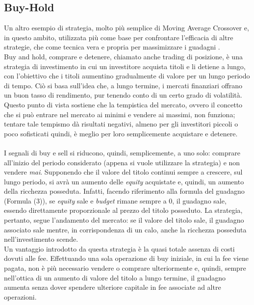 \documentclass[a4paper,12pt]{report}
\begin{document}
\subsection{Buy-Hold}
Un altro esempio di strategia, molto più semplice di Moving Average Crossover e, in questo ambito, utilizzata più come base per confrontare l'efficacia di altre strategie, che come tecnica vera e propria per massimizzare i guadagni .\\
Buy and hold, comprare e detenere, chiamato anche trading di posizione, è una strategia di investimento in cui un investitore acquista titoli e li detiene a lungo, con l'obiettivo che i titoli aumentino gradualmente di valore per un lungo periodo di tempo. Ciò si basa sull'idea che, a lungo termine, i mercati finanziari offrano un buon tasso di rendimento, pur tenendo conto di un certo grado di volatilità. Questo punto di vista sostiene che la tempistica del mercato, ovvero il concetto che si può entrare nel mercato ai minimi e vendere ai massimi, non funziona; tentare tale tempismo dà risultati negativi, almeno per gli investitori piccoli o poco sofisticati quindi, è meglio per loro semplicemente acquistare e detenere.\\~\\ I segnali di buy e sell si riducono, quindi, semplicemente, a uno solo: comprare all'inizio del periodo considerato (appena si vuole utilizzare la strategia) e non vendere \textit{mai}. Supponendo che il valore del titolo continui sempre a crescere, sul lungo periodo, si avrà un aumento delle \textit{equity} acquistate e, quindi, un aumento della ricchezza posseduta. Infatti, facendo riferimento alla formula del guadagno (Formula (3)), se \textit{equity} sale e \textit{budget} rimane sempre a 0, il guadagno sale, essendo direttamente proporzionale al prezzo del titolo posseduto. La strategia, pertanto, segue l'andamento del mercato: se il valore del titolo sale, il guadagno associato sale mentre, in corrispondenza di un calo, anche la ricchezza posseduta nell'investimento scende.\\
Un vantaggio introdotto da questa strategia è la quasi totale assenza di costi dovuti alle fee. Effettuando una sola operazione di buy iniziale, in cui la fee viene pagata, non è più necessario vendere o comprare ulteriormente e, quindi, sempre nell'ottica di un aumento di valore del titolo a lungo termine, il guadagno aumenta senza dover spendere ulteriore capitale in fee associate ad altre operazioni.\\~\\
\end{document}
